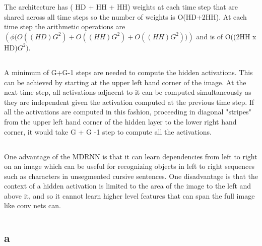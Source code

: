\documentclass[12pt,letterpaper]{article} %
\begin{document}
\section{}
\subsection{}
The architecture has ( HD + HH + HH) weights at each time step that are shared across all time steps so the number of weights is O(HD+2HH). At each time step the arithmetic operations are $(\phi\big ( O((HD)G^2) + O((HH)G^2) + O((HH)G^2) \big))$ and is of O((2HH x HD)$G^2)$.
\subsection{}
A minimum of G+G-1 steps are needed to compute the hidden activations. This can be achieved by starting at the upper left hand corner of the image. At the next time step, all activations adjacent to it can be computed simultaneously as they are independent given the activation computed at the previous time step. If all the activations are computed in this fashion, proceeding in diagonal "stripes" from the upper left hand corner of the hidden layer to the lower right hand corner, it would take G + G -1 step to compute all the activations. 

\subsection{}
One advantage of the MDRNN is that it can learn dependencies from left to right on an image which can be useful for recognizing objects in left to right sequences such as characters in unsegmented cursive sentences. One disadvantage is that the context of a hidden activation is limited to the area of the image to the left and above it, and so it cannot learn higher level features that can span the full image like conv nets can. 

\section{}
\subsection{a}
\end{document}
